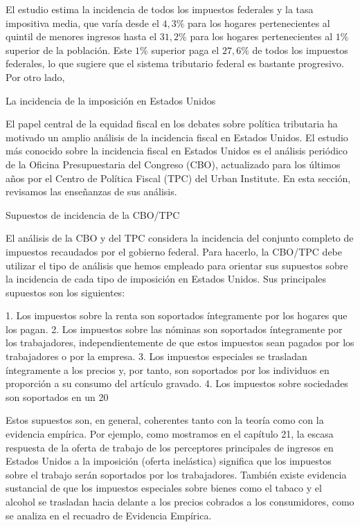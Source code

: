\documentclass[10pt,a4paper]{article}
\begin{document}
El estudio estima la incidencia de todos los impuestos federales y la tasa impositiva media, que varía desde el $4,3\%$ para los hogares pertenecientes al quintil de menores ingresos hasta el $31,2\%$ para los hogares pertenecientes al $1\%$ superior de la población. Este $1\%$ superior paga el $27,6\%$ de todos los impuestos federales, lo que  sugiere que el sistema tributario federal es bastante progresivo. Por otro lado, 









La incidencia de la imposición en Estados Unidos

El papel central de la equidad fiscal en los debates sobre política tributaria ha motivado un amplio análisis de la incidencia fiscal en Estados Unidos. El estudio más conocido sobre la incidencia fiscal en Estados Unidos es el análisis periódico de la Oficina Presupuestaria del Congreso (CBO), actualizado para los últimos años por el Centro de Política Fiscal (TPC) del Urban Institute. En esta sección, revisamos las enseñanzas de sus análisis.

Supuestos de incidencia de la CBO/TPC

El análisis de la CBO y del TPC considera la incidencia del conjunto completo de impuestos recaudados por el gobierno federal. Para hacerlo, la CBO/TPC debe utilizar el tipo de análisis que hemos empleado para orientar sus supuestos sobre la incidencia de cada tipo de imposición en Estados Unidos. Sus principales supuestos son los siguientes:

1. Los impuestos sobre la renta son soportados íntegramente por los hogares que los pagan.
2. Los impuestos sobre las nóminas son soportados íntegramente por los trabajadores, independientemente de que estos impuestos sean pagados por los trabajadores o por la empresa.
3. Los impuestos especiales se trasladan íntegramente a los precios y, por tanto, son soportados por los individuos en proporción a su consumo del artículo gravado.
4. Los impuestos sobre sociedades son soportados en un 20 %

Estos supuestos son, en general, coherentes tanto con la teoría como con la evidencia empírica. Por ejemplo, como mostramos en el capítulo 21, la escasa respuesta de la oferta de trabajo de los perceptores principales de ingresos en Estados Unidos a la imposición (oferta inelástica) significa que los impuestos sobre el trabajo serán soportados por los trabajadores. También existe evidencia sustancial de que los impuestos especiales sobre bienes como el tabaco y el alcohol se trasladan hacia delante a los precios cobrados a los consumidores, como se analiza en el recuadro de Evidencia Empírica.
\end{document}
